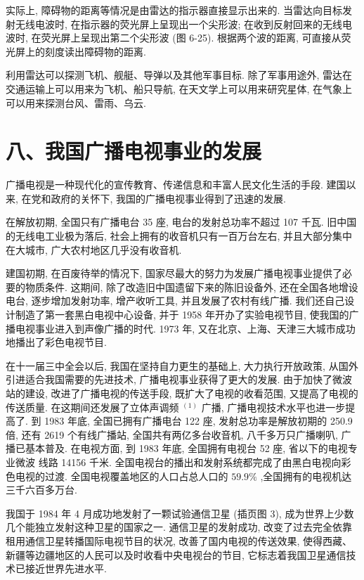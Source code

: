 \documentclass[10pt]{article}
\begin{document}
实际上, 障碍物的距离等情况是由雷达的指示器直接显示出来的. 当雷达向目标发射无线电波时, 在指示器的荧光屏上呈现出一个尖形波; 在收到反射回来的无线电波时, 在荧光屏上呈现出第二个尖形波 (图 6-25). 根据两个波的距离, 可直接从荧光屏上的刻度读出障碍物的距离.

利用雷达可以探测飞机、舰艇、导弹以及其他军事目标. 除了军事用途外, 雷达在交通运输上可以用来为飞机、船只导航, 在天文学上可以用来研究星体, 在气象上可以用来探测台风、雷雨、乌云.

\section*{八、我国广播电视事业的发展}

广播电视是一种现代化的宣传教育、传递信息和丰富人民文化生活的手段. 建国以来, 在党和政府的关怀下, 我国的广播电视事业得到了迅速的发展.

在解放初期, 全国只有广播电台 35 座, 电台的发射总功率不超过 107 千瓦. 旧中国的无线电工业极为落后, 社会上拥有的收音机只有一百万台左右, 并且大部分集中在大城市, 广大农村地区几乎没有收音机.

建国初期, 在百废待举的情况下, 国家尽最大的努力为发展广播电视事业提供了必要的物质条件. 这期间, 除了改造旧中国遗留下来的陈旧设备外, 还在全国各地增设电台, 逐步增加发射功率, 增产收听工具, 并且发展了农村有线广播. 我们还自己设计制造了第一套黑白电视中心设备, 并于 1958 年开办了实验电视节目, 使我国的广播电视事业进入到声像广播的时代. 1973 年, 又在北京、上海、天津三大城市成功地播出了彩色电视节目.

在十一届三中全会以后, 我国在坚持自力更生的基础上, 大力执行开放政策, 从国外引进适合我国需要的先进技术, 广播电视事业获得了更大的发展. 由于加快了微波站的建设, 改进了广播电视的传送手段, 既扩大了电视的收看范围, 又提高了电视的传送质量. 在这期间还发展了立体声调频 \({}^{\left( 1\right) }\) 广播, 广播电视技术水平也进一步提高了. 到 1983 年底, 全国已拥有广播电台 122 座, 发射总功率是解放初期的 250.9 倍, 还有 2619 个有线广播站, 全国共有两亿多台收音机, 八千多万只广播喇叭, 广播已基本普及. 在电视方面, 到 1983 年底, 全国拥有电视台 52 座, 省以下的电视专业微波 线路 14156 千米. 全国电视台的播出和发射系统都完成了由黑白电视向彩色电视的过渡. 全国电视覆盖地区的人口占总人口的 \({59.9}\%\) ,全国拥有的电视机达三千六百多万台.

我国于 1984 年 4 月成功地发射了一颗试验通信卫星 (插页图 3), 成为世界上少数几个能独立发射这种卫星的国家之一. 通信卫星的发射成功, 改变了过去完全依靠租用通信卫星转播国际电视节目的状况, 改善了国内电视的传送效果, 使得西藏、新疆等边疆地区的人民可以及时收看中央电视台的节目, 它标志着我国卫星通信技术已接近世界先进水平.
\end{document}
